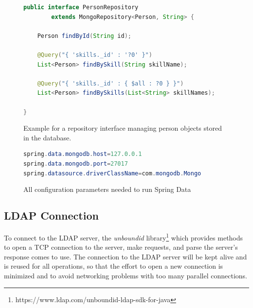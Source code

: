 \begin{figure}[h]
\begin{lstlisting}[language=Java]
public interface PersonRepository
		extends MongoRepository<Person, String> {

	Person findById(String id);

	@Query("{ 'skills._id' : '?0' }")
	List<Person> findBySkill(String skillName);

	@Query("{ 'skills._id' : { $all : ?0 } }")
	List<Person> findBySkills(List<String> skillNames);

}
\end{lstlisting}
\caption[Code: Example Repository Interface]{Example for a repository interface managing person objects stored in the database.}
\end{figure}

\begin{figure}[h]
\begin{lstlisting}[language=Java]
spring.data.mongodb.host=127.0.0.1
spring.data.mongodb.port=27017
spring.datasource.driverClassName=com.mongodb.Mongo
\end{lstlisting}
\caption[Code: Spring Data Config]{All configuration parameters needed to run Spring Data}
\end{figure}

\subsection{LDAP Connection}
To connect to the LDAP server, the \textit{unboundid} library\footnote{https://www.ldap.com/unboundid-ldap-sdk-for-java} which provides methods to open a TCP connection to the server, make requests, and parse the server's response comes to use. The connection to the LDAP server will be kept alive and is reused for all operations, so that the effort to open a new connection is minimized and to avoid networking problems with too many parallel connections.


